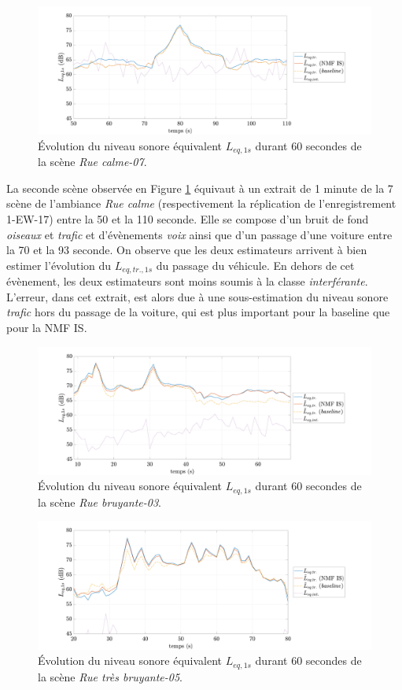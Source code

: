 \begin{figure}[h!]
\centering
\includegraphics[width=.8\linewidth]{./figures/NMF/Lp_quietStreet_7.pdf} 
\caption{Évolution du niveau sonore équivalent $L_{eq, 1s}$ durant 60 secondes de la scène \textit{Rue calme-07}.} 
\label{fig:Lp_quiet}
\end{figure}

La seconde scène observée en Figure \ref{fig:Lp_quiet} équivaut à un extrait de 1 minute de la 7\ieme{} scène de l'ambiance \textit{Rue calme} (respectivement la réplication de  l'enregistrement 1-EW-17) entre la 50\ieme{} et la 110\ieme{} seconde. Elle se compose d'un bruit de fond \textit{oiseaux} et \textit{trafic} et d'évènements \textit{voix} ainsi que d'un passage d'une voiture entre la 70\ieme{} et la 93\ieme{} seconde. On observe que les deux estimateurs arrivent à bien estimer l'évolution du $L_{eq,tr.,1s}$ du passage du véhicule. En dehors de cet évènement, les deux estimateurs sont moins soumis à la classe \textit{interférante}. L'erreur, dans cet extrait, est alors due à une sous-estimation du niveau sonore \textit{trafic} hors du passage de la voiture, qui est plus important pour la baseline que pour la NMF IS.


\begin{figure}[h!]
\centering
\includegraphics[width=.8\linewidth]{./figures/NMF/Lp_noisyStreet_3.pdf} 
\caption{Évolution du niveau sonore équivalent $L_{eq, 1s}$ durant 60 secondes de la scène \textit{Rue bruyante-03}.} 
\label{fig:Lp_noisy}
\end{figure}

\begin{figure}[h!]
\centering
\includegraphics[width=.8\linewidth]{./figures/NMF/Lp_veryNoisyStreet_5.pdf} 
\caption{Évolution du niveau sonore équivalent $L_{eq, 1s}$ durant 60 secondes de la scène \textit{Rue très bruyante-05}.} 
\label{fig:Lp_veryNoisy}
\end{figure}


